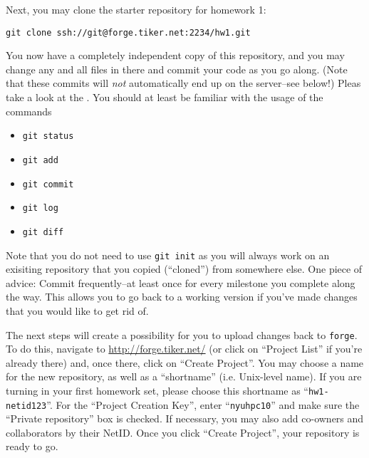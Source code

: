\documentclass[11pt]{article}
\begin{document}
Next, you may clone the starter repository for homework 1:
\begin{lstlisting}
git clone ssh://git@forge.tiker.net:2234/hw1.git
\end{lstlisting}
You now have a completely independent copy of this repository, and you
may change any and all files in there and commit your code as you go
along. (Note that these commits will \emph{not} automatically end up
on the server--see below!) Pleas take a look at the 
. You should at least be familiar with the usage of the commands
\begin{itemize}
  \item \texttt{git status}
  \item \texttt{git add}
  \item \texttt{git commit}
  \item \texttt{git log}
  \item \texttt{git diff}
\end{itemize}
Note that you do not need to use \texttt{git init} as you will always
work on an exisiting repository that you copied (``cloned'') from
somewhere else.  One piece of advice: Commit frequently--at least once
for every milestone you complete along the way. This allows you
to go back to a working version if you've made changes that you would
like to get rid of.

The next steps will create a possibility for you to upload changes
back to \texttt{forge}.  To do this, navigate to
\url{http://forge.tiker.net/} (or click on ``Project List'' if you're
already there) and, once there, click on ``Create Project''. You may
choose a name for the new repository, as well as a ``shortname'' (i.e.
Unix-level name). If you are turning in your first homework set,
please choose this shortname as ``\texttt{hw1-netid123}''.  For the
``Project Creation Key'', enter ``\texttt{nyuhpc10}'' and make sure
the ``Private repository'' box is checked. If necessary, you may also
add co-owners and collaborators by their NetID. Once you click
``Create Project'', your repository is ready to go.
\end{document}
